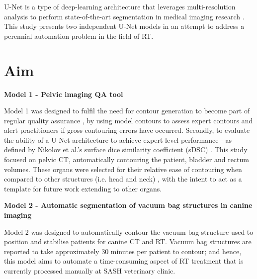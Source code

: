 U-Net is a type of deep-learning architecture that leverages multi-resolution
analysis to perform state-of-the-art segmentation in medical imaging research
\cite{Kazemifar_2018, Zhu_2018}. This study presents two independent U-Net
models in an attempt to address a perennial automation problem in the field of
RT.

\section{Aim}

\textbf{Model 1 - Pelvic imaging QA tool}

Model 1 was designed to fulfil the need for contour generation to become part of
regular quality assurance \cite{Vinod_2016}, by using model contours to assess
expert contours and alert practitioners if gross contouring errors have
occurred. Secondly, to evaluate the ability of a U-Net architecture to achieve
expert level performance - as defined by Nikolov et al.'s surface dice
similarity coefficient (sDSC) \cite{Nikolov_2018}. This study focused on pelvic
CT, automatically contouring the patient, bladder and rectum volumes. These
organs were selected for their relative ease of contouring when compared to
other structures (i.e. head and neck) \cite{Wong2020}, with the intent to act as
a template for future work extending to other organs.

\textbf{Model 2 - Automatic segmentation of vacuum bag structures in canine
imaging}

Model 2 was designed to automatically contour the vacuum bag structure used to
position and stabilise patients for canine CT and RT. Vacuum bag structures are
reported to take approximately 30 minutes per patient to contour; and hence,
this model aims to automate a time-consuming aspect of RT treatment that is
currently processed manually at SASH veterinary clinic.


